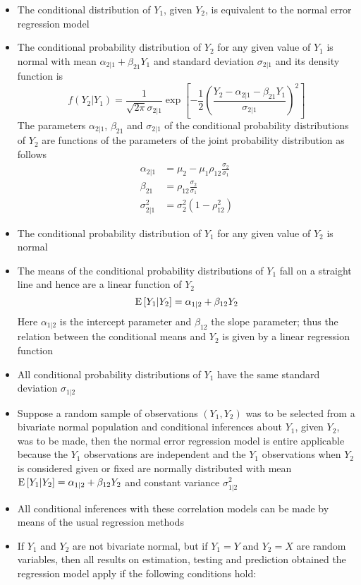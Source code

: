 \begin{itemize}
\item The conditional distribution of $Y_1$, given $Y_2$, is equivalent to the normal error regression model
\item The conditional probability distribution of $Y_2$ for any given value of $Y_1$ is normal with mean $\alpha_{2|1} + \beta_{21}Y_1$ and standard deviation $\sigma_{2|1}$ and its density function is $$ f(Y_2|Y_1) = \frac{1}{\sqrt{2\pi} \sigma_{2|1}} \exp\left[ -\frac{1}{2} \left( \frac{Y_2 - \alpha_{2|1} - \beta_{21}Y_1}{\sigma_{2|1}} \right)^2 \right] $$ The parameters $\alpha_{2|1}$, $\beta_{21}$ and $\sigma_{2|1}$ of the conditional probability distributions of $Y_2$ are functions of the parameters of the joint probability distribution as follows $$ \begin{aligned} \alpha_{2|1} &= \mu_2 - \mu_1\rho_{12}\frac{\sigma_2}{\sigma_1} \\ \beta_{21} &= \rho_{12}\frac{\sigma_2}{\sigma_1} \\ \sigma^2_{2|1} &= \sigma_2^2(1-\rho^2_{12}) \end{aligned} $$ 
\item The conditional probability distribution of $Y_1$ for any given value of $Y_2$ is normal 
\item The means of the conditional probability distributions of $Y_1$ fall on a straight line and hence are a linear function of $Y_2$ $$ \mathrm{E}\left[ Y_1|Y_2 \right] = \alpha_{1|2} + \beta_{12}Y_2 $$ Here $\alpha_{1|2}$ is the intercept parameter and $\beta_{12}$ the slope parameter; thus the relation between the conditional means and $Y_2$ is given by a linear regression function 
\item All conditional probability distributions of $Y_1$ have the same standard deviation $\sigma_{1|2}$
\item Suppose a random sample of observations $(Y_1, Y_2)$ was to be selected from a bivariate normal population and conditional inferences about $Y_1$, given $Y_2$, was to be made, then the normal error regression model is entire applicable because the $Y_1$ observations are independent and the $Y_1$ observations when $Y_2$ is considered given or fixed are normally distributed with mean $\mathrm{E}\left[ Y_1|Y_2 \right] = \alpha_{1|2} + \beta_{12}Y_2$ and constant variance $\sigma^2_{1|2}$
\item All conditional inferences with these correlation models can be made by means of the usual regression methods 
\item If $Y_1$ and $Y_2$ are not bivariate normal, but if $Y_1=Y$ and $Y_2=X$ are random variables, then all results on estimation, testing and prediction obtained the regression model apply if the following conditions hold: \begin{itemize} 

\end{itemize}
\end{itemize}
